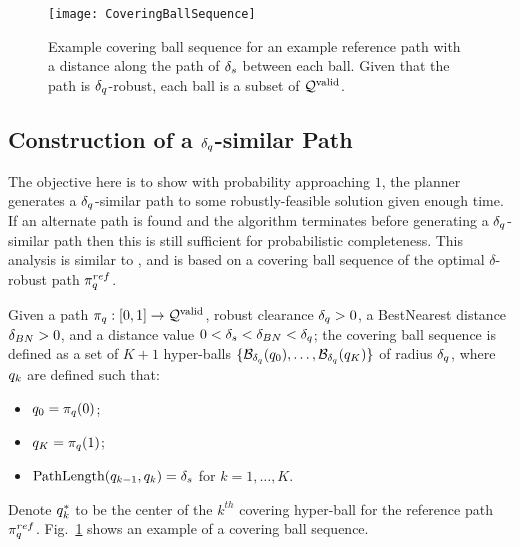 

\begin{figure}
    \centering
    \texttt{[image: CoveringBallSequence]}
    \caption{Example covering ball sequence for an example reference path with a distance along the path of $\delta_s$ between each ball. Given that the path is $\delta_q$-robust, each ball is a subset of $\mathcal{Q}^{\textrm{valid}}$.}
    \label{fig:covering_ball_sequence}
\end{figure}


\subsection{Construction of a $\delta_q$-similar Path}
\label{sec:delta_sim_traj_construction}

The objective here is to show with probability approaching $1$, the planner generates a $\delta_q$-similar path to some robustly-feasible solution given enough time.  If an alternate path is found and the algorithm terminates before generating a $\delta_q$-similar path then this is still sufficient for probabilistic completeness.  This analysis is similar to \cite{LiAOKP2016}, and is based on a covering ball sequence of the optimal  $\delta$-robust path $\pi_{q}^{ref}$.

\begin{definition}
    \label{def:coveringballseq}
    Given a path $\pi_{q} : [0, 1] \rightarrow \mathcal{Q}^{\textrm{valid}}$, robust clearance $\delta_q > 0$, a BestNearest distance $\delta_{BN} > 0$, and a distance value $0 < \delta_s < \delta_{BN} < \delta_q$; the covering ball sequence is defined as a set of $K + 1$ hyper-balls $\{ \mathcal{B}_{\delta_q}(q_0), \dots, \mathcal{B}_{\delta_q}(q_K) \}$ of radius $\delta_q$, where $q_k$ are defined such that:
    \begin{itemize}
        \item $q_0 = \pi_{q}(0)$;
        \item $q_K = \pi_{q}(1)$;
        \item $\textup{PathLength}(q_{k-1}, q_k) = \delta_s$ for $k = 1, \dots, K$.
    \end{itemize}
\end{definition}
\noindent
Denote $q^*_k$ to be the center of the $k^{th}$ covering hyper-ball for the reference path $\pi_{q}^{ref}$. Fig.~\ref{fig:covering_ball_sequence} shows an example of a covering ball sequence.


